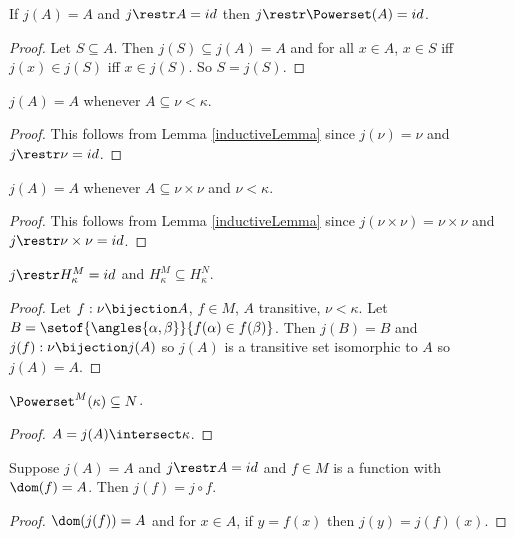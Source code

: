 \documentclass[oneside,12pt]{amsart}
\begin{document}
\begin{lemma}
\label{inductiveLemma}
If $j(A) = A$ and $j\restr A = id$ then $j\restr \Powerset(A) = id$.
\end{lemma}
\begin{proof}
Let $S\subseteq A$. Then $j(S) \subseteq j(A) = A$ and for all $x\in A$,
$x \in S$ iff $j(x) \in j(S)$ iff $x\in j(S)$. So $S = j(S)$.
\end{proof}


\begin{corollary}
\label{subsetLemma}
$j(A) = A$ whenever $A\subseteq \nu < \kappa$.
\end{corollary}
\begin{proof}
This follows from Lemma \ref{inductiveLemma} since $j(\nu) = \nu$ and
$j \restr \nu = id$.
\end{proof}

\begin{lemma}
\label{crossProductLemma}
$j(A) = A$ whenever $A\subseteq \nu \times \nu $ and $\nu < \kappa$.
\end{lemma}
\begin{proof}
This follows from Lemma \ref{inductiveLemma} since $j(\nu \times \nu) = \nu \times \nu$ and
$j \restr \nu \times \nu = id$.
\end{proof}

\begin{lemma}
$j\restr H^{M}_{\kappa} = id$ and $H^{M}_{\kappa}\subseteq H^{N}_{\kappa}$.
\end{lemma}
\begin{proof}
Let $f:\nu\bijection A$, $f\in M$, $A$ transitive, $\nu<\kappa$. Let
$B=\setof{\angles{\alpha, \beta}}{f(\alpha) \in f(\beta)}$. Then $j(B) = B$
and $j(f):\nu\bijection j(A)$ so $j(A)$ is a transitive set isomorphic to $A$
so $j(A)=A$.
\end{proof}

\begin{lemma}
\label{lemma0}
$\Powerset^{M}(\kappa) \subseteq N$.
\end{lemma}
\begin{proof}
$A=j(A)\intersect\kappa$.
\end{proof}

\begin{lemma}
\label{lemma1}
Suppose $j(A) = A$ and $j\restr A = id$ and $f\in M$ is a function with $\dom(f) = A$. Then $j(f) = j \circ f$.
\end{lemma}
\begin{proof}
$\dom(j(f)) = A$ and for  $x \in A$, if $y = f(x)$ then $j(y) = j(f)(x)$.
\end{proof}
\end{document}
